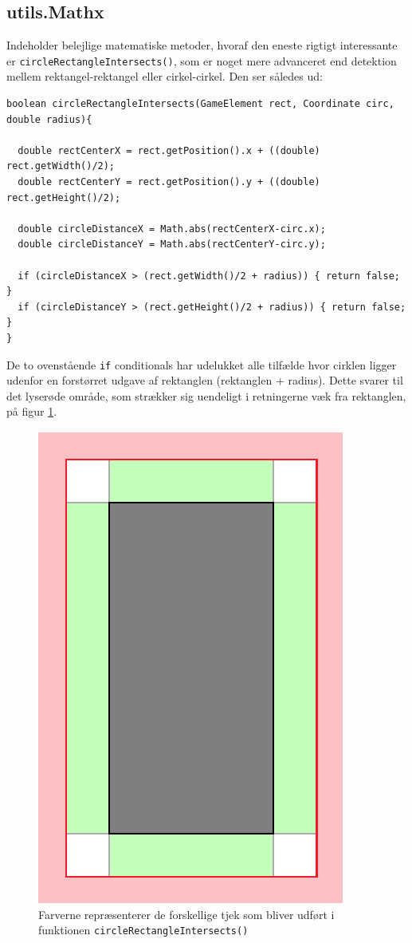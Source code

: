 \documentclass[titlepage,danish]{article}
\newcommand{\code}[1]{\texttt{#1}}
\begin{document}
\subsection{utils.Mathx} Indeholder belejlige matematiske metoder, hvoraf den eneste rigtigt
interessante er \code{circleRectangleIntersects()}, som er noget mere advanceret end detektion
mellem rektangel-rektangel eller cirkel-cirkel. Den ser således ud:

\begin{verbatim}
boolean circleRectangleIntersects(GameElement rect, Coordinate circ, double radius){

  double rectCenterX = rect.getPosition().x + ((double) rect.getWidth()/2);
  double rectCenterY = rect.getPosition().y + ((double) rect.getHeight()/2);

  double circleDistanceX = Math.abs(rectCenterX-circ.x);
  double circleDistanceY = Math.abs(rectCenterY-circ.y);

  if (circleDistanceX > (rect.getWidth()/2 + radius)) { return false; }
  if (circleDistanceY > (rect.getHeight()/2 + radius)) { return false; }
}
\end{verbatim}

De to ovenstående \code{if} conditionals har udelukket alle tilfælde hvor cirklen ligger udenfor en
forstørret udgave af rektanglen (rektanglen + radius). Dette svarer til det lyserøde område, som strækker sig uendeligt i retningerne væk fra rektanglen, på
figur \ref{fig:col_rect}.

\begin{figure}[h!]
  \centering
  \includegraphics[scale=0.60]{rekt_cirk_02.eps}
  \caption{Farverne repræsenterer de forskellige tjek som bliver udført i funktionen \code{circleRectangleIntersects()}}
  \label{fig:col_rect}
\end{figure}
\end{document}
